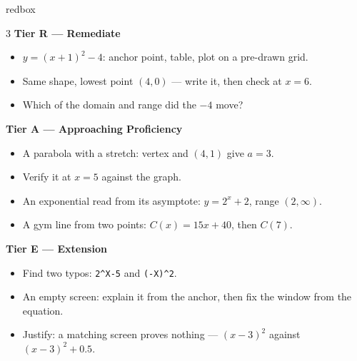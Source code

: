 \documentclass[10pt]{article}
\begin{document}
\boxguard
\begin{skillbox}{redbox}
\begin{multicols}{3}
\textbf{Tier R --- Remediate}
\begin{itemize}[leftmargin=1em, itemsep=1pt, topsep=2pt]
  \item $y=(x+1)^2-4$: anchor point, table, plot on a pre-drawn grid.
  \item Same shape, lowest point $(4,0)$ --- write it, then check at $x=6$.
  \item Which of the domain and range did the $-4$ move?
\end{itemize}

\columnbreak
\textbf{Tier A --- Approaching Proficiency}
\begin{itemize}[leftmargin=1em, itemsep=1pt, topsep=2pt]
  \item A parabola with a stretch: vertex and $(4,1)$ give $a=3$.
  \item Verify it at $x=5$ against the graph.
  \item An exponential read from its asymptote: $y=2^x+2$, range $(2,\infty)$.
  \item A gym line from two points: $C(x)=15x+40$, then $C(7)$.
\end{itemize}

\columnbreak
\textbf{Tier E --- Extension}
\begin{itemize}[leftmargin=1em, itemsep=1pt, topsep=2pt]
  \item Find two typos: \texttt{2\^{}X-5} and \texttt{(-X)\^{}2}.
  \item An empty screen: explain it from the anchor, then fix the window from the equation.
  \item Justify: a matching screen proves nothing --- $(x-3)^2$ against $(x-3)^2+0.5$.
\end{itemize}
\end{multicols}
\end{skillbox}
\end{document}
